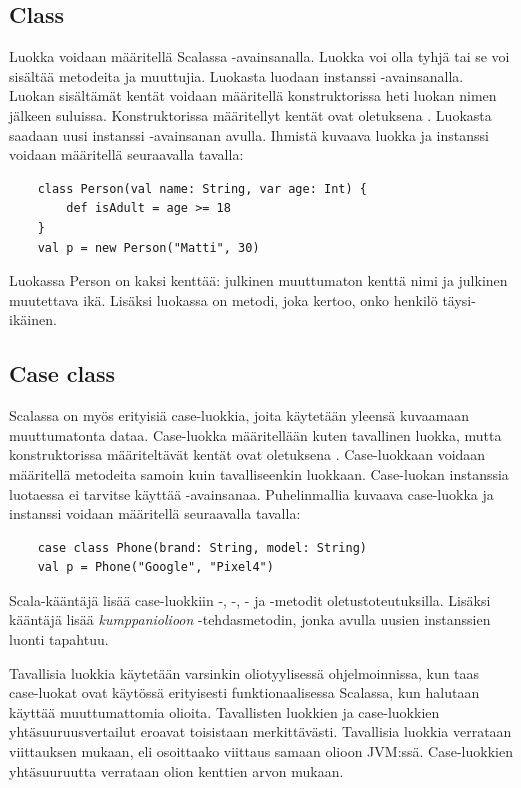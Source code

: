 \subsection{Class} \label{class}
Luokka voidaan määritellä Scalassa -avainsanalla. Luokka voi olla tyhjä tai se voi sisältää metodeita ja muuttujia. Luokasta luodaan instanssi -avainsanalla. Luokan sisältämät kentät voidaan määritellä konstruktorissa heti luokan nimen jälkeen suluissa. Konstruktorissa määritellyt kentät ovat oletuksena . Luokasta saadaan uusi instanssi -avainsanan avulla. Ihmistä kuvaava luokka ja instanssi voidaan määritellä seuraavalla tavalla:
\begin{lstlisting}
    class Person(val name: String, var age: Int) {
        def isAdult = age >= 18
    }
    val p = new Person("Matti", 30)
\end{lstlisting}
Luokassa Person on kaksi kenttää: julkinen muuttumaton kenttä nimi ja julkinen muutettava ikä. Lisäksi luokassa on metodi, joka kertoo, onko henkilö täysi-ikäinen.
\cite[Classes]{tourOfScala}


\subsection{Case class} \label{caseclass}
Scalassa on myös erityisiä case-luokkia, joita käytetään yleensä kuvaamaan muuttumatonta dataa. Case-luokka määritellään kuten tavallinen luokka, mutta konstruktorissa määriteltävät kentät ovat oletuksena . Case-luokkaan voidaan määritellä metodeita samoin kuin tavalliseenkin luokkaan. Case-luokan instanssia luotaessa ei tarvitse käyttää -avainsanaa. Puhelinmallia kuvaava case-luokka ja instanssi voidaan määritellä seuraavalla tavalla:
\begin{lstlisting}
    case class Phone(brand: String, model: String)
    val p = Phone("Google", "Pixel4")
\end{lstlisting}
Scala-kääntäjä lisää case-luokkiin -, -, - ja -metodit oletustoteutuksilla. Lisäksi kääntäjä lisää \textit{kumppaniolioon} -tehdasmetodin, jonka avulla uusien instanssien luonti tapahtuu.
\cite[Luku 15]{prorgrammingInScala3rd}

Tavallisia luokkia käytetään varsinkin oliotyylisessä ohjelmoinnissa, kun taas case-luokat ovat käytössä erityisesti funktionaalisessa Scalassa, kun halutaan käyttää muuttumattomia olioita. Tavallisten luokkien ja case-luokkien yhtäsuuruusvertailut eroavat toisistaan merkittävästi. Tavallisia luokkia verrataan viittauksen mukaan, eli osoittaako viittaus samaan olioon JVM:ssä. Case-luokkien yhtäsuuruutta verrataan olion kenttien arvon mukaan.
\cite[Luku 15]{prorgrammingInScala3rd}


